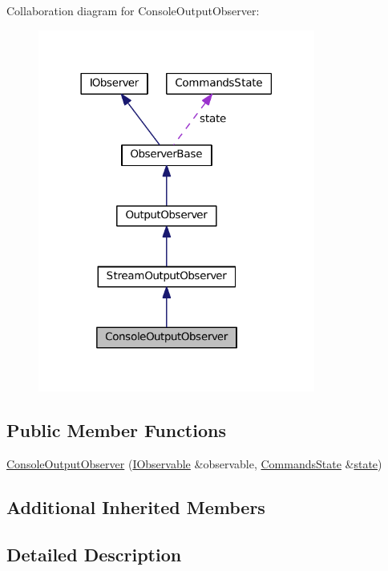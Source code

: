 Collaboration diagram for Console\+Output\+Observer\+:
\nopagebreak
\begin{figure}[H]
\begin{center}
\leavevmode
\includegraphics[width=258pt]{struct_console_output_observer__coll__graph}
\end{center}
\end{figure}
\subsection*{Public Member Functions}
\begin{DoxyCompactItemize}
\item 
\hyperlink{struct_console_output_observer_a4f4f1abf132c680b2f0913183d089f08}{Console\+Output\+Observer} (\hyperlink{struct_i_observable}{I\+Observable} \&observable, \hyperlink{class_commands_state}{Commands\+State} \&\hyperlink{struct_observer_base_a107ad54040309605fa5fafd481b97f2f}{state})
\end{DoxyCompactItemize}
\subsection*{Additional Inherited Members}


\subsection{Detailed Description}


